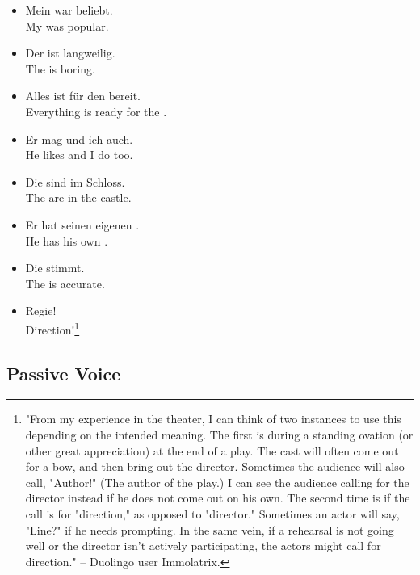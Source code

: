 \begin{itemize}
  \item  Mein  war beliebt. \\
  My  was popular.
  \item  Der  ist langweilig. \\
  The  is boring.
  \item  Alles ist f{\"u}r den  bereit. \\
  Everything is ready for the .
  \item  Er mag  und ich auch. \\
  He likes  and I do too.
  \item  Die  sind im Schloss. \\
  The  are in the castle.
  \item  Er hat seinen eigenen . \\
  He has his own .
  \item  Die  stimmt. \\
  The  is accurate.
  \item  Regie! \\
  Direction!\footnote{"From my experience in the theater, I can think of two instances to use this depending on the intended meaning.  The first is during a standing ovation (or other great appreciation) at the end of a play. The cast will often come out for a bow, and then bring out the director. Sometimes the audience will also call, "Author!" (The author of the play.) I can see the audience calling for the director instead if he does not come out on his own.  The second time is if the call is for "direction," as opposed to "director." Sometimes an actor will say, "Line?" if he needs prompting. In the same vein, if a rehearsal is not going well or the director isn't actively participating, the actors might call for direction." -- Duolingo user Immolatrix.}
\end{itemize}


\pagebreak
\subsection{Passive Voice}


